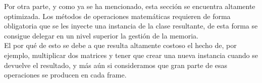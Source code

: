 Por otra parte, y como ya se ha mencionado, esta sección se encuentra altamente optimizada. Los métodos de operaciones matemáticas requieren de forma obligatoria que se les inyecte una instancia de la clase resultante, de esta forma se consigue delegar en un nivel superior la gestión de la memoria.\\
El por qué de esto se debe a que resulta altamente costoso el hecho de, por ejemplo, multiplicar dos matrices y tener que crear una nueva instancia cuando se devuelve el resultado, y más aún si consideramos que gran parte de esas operaciones se producen en cada frame.